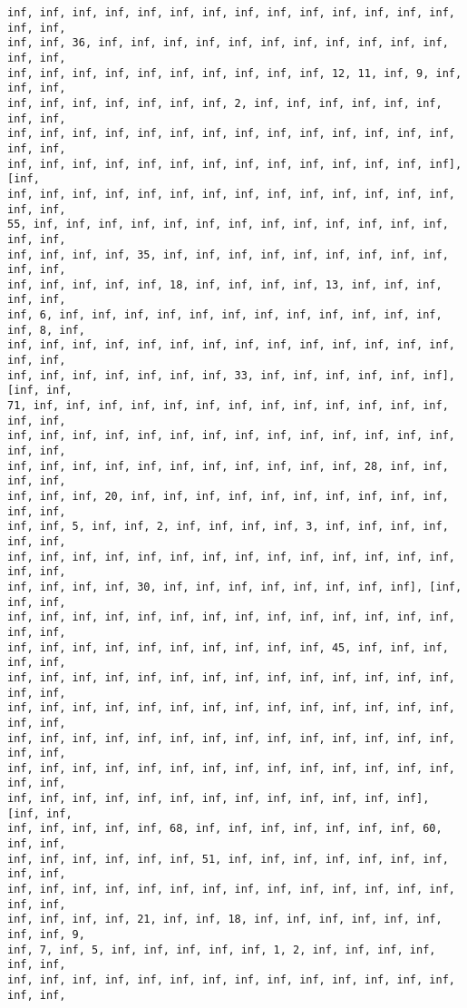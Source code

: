 \documentclass[11pt]{article}
\begin{document}
\begin{Verbatim}[commandchars=\\\{\}]
inf, inf, inf, inf, inf, inf, inf, inf, inf, inf, inf, inf, inf, inf, inf, inf,
inf, inf, 36, inf, inf, inf, inf, inf, inf, inf, inf, inf, inf, inf, inf, inf,
inf, inf, inf, inf, inf, inf, inf, inf, inf, inf, 12, 11, inf, 9, inf, inf, inf,
inf, inf, inf, inf, inf, inf, inf, 2, inf, inf, inf, inf, inf, inf, inf, inf,
inf, inf, inf, inf, inf, inf, inf, inf, inf, inf, inf, inf, inf, inf, inf, inf,
inf, inf, inf, inf, inf, inf, inf, inf, inf, inf, inf, inf, inf, inf], [inf,
inf, inf, inf, inf, inf, inf, inf, inf, inf, inf, inf, inf, inf, inf, inf, inf,
55, inf, inf, inf, inf, inf, inf, inf, inf, inf, inf, inf, inf, inf, inf, inf,
inf, inf, inf, inf, 35, inf, inf, inf, inf, inf, inf, inf, inf, inf, inf, inf,
inf, inf, inf, inf, inf, 18, inf, inf, inf, inf, 13, inf, inf, inf, inf, inf,
inf, 6, inf, inf, inf, inf, inf, inf, inf, inf, inf, inf, inf, inf, inf, 8, inf,
inf, inf, inf, inf, inf, inf, inf, inf, inf, inf, inf, inf, inf, inf, inf, inf,
inf, inf, inf, inf, inf, inf, inf, 33, inf, inf, inf, inf, inf, inf], [inf, inf,
71, inf, inf, inf, inf, inf, inf, inf, inf, inf, inf, inf, inf, inf, inf, inf,
inf, inf, inf, inf, inf, inf, inf, inf, inf, inf, inf, inf, inf, inf, inf, inf,
inf, inf, inf, inf, inf, inf, inf, inf, inf, inf, inf, 28, inf, inf, inf, inf,
inf, inf, inf, 20, inf, inf, inf, inf, inf, inf, inf, inf, inf, inf, inf, inf,
inf, inf, 5, inf, inf, 2, inf, inf, inf, inf, 3, inf, inf, inf, inf, inf, inf,
inf, inf, inf, inf, inf, inf, inf, inf, inf, inf, inf, inf, inf, inf, inf, inf,
inf, inf, inf, inf, 30, inf, inf, inf, inf, inf, inf, inf, inf], [inf, inf, inf,
inf, inf, inf, inf, inf, inf, inf, inf, inf, inf, inf, inf, inf, inf, inf, inf,
inf, inf, inf, inf, inf, inf, inf, inf, inf, inf, 45, inf, inf, inf, inf, inf,
inf, inf, inf, inf, inf, inf, inf, inf, inf, inf, inf, inf, inf, inf, inf, inf,
inf, inf, inf, inf, inf, inf, inf, inf, inf, inf, inf, inf, inf, inf, inf, inf,
inf, inf, inf, inf, inf, inf, inf, inf, inf, inf, inf, inf, inf, inf, inf, inf,
inf, inf, inf, inf, inf, inf, inf, inf, inf, inf, inf, inf, inf, inf, inf, inf,
inf, inf, inf, inf, inf, inf, inf, inf, inf, inf, inf, inf, inf], [inf, inf,
inf, inf, inf, inf, inf, 68, inf, inf, inf, inf, inf, inf, inf, 60, inf, inf,
inf, inf, inf, inf, inf, inf, 51, inf, inf, inf, inf, inf, inf, inf, inf, inf,
inf, inf, inf, inf, inf, inf, inf, inf, inf, inf, inf, inf, inf, inf, inf, inf,
inf, inf, inf, inf, 21, inf, inf, 18, inf, inf, inf, inf, inf, inf, inf, inf, 9,
inf, 7, inf, 5, inf, inf, inf, inf, inf, 1, 2, inf, inf, inf, inf, inf, inf,
inf, inf, inf, inf, inf, inf, inf, inf, inf, inf, inf, inf, inf, inf, inf, inf,

\end{Verbatim}
\end{document}
